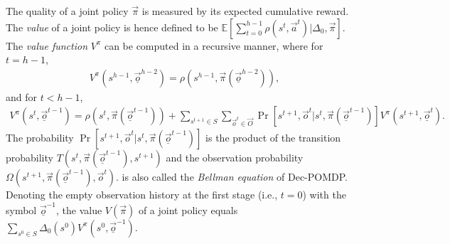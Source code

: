 The quality of a joint policy $\vec{\pi}$ is measured by its expected cumulative reward.
The \textit{value} of a joint policy is hence defined to be $\mathbb{E}[\sum_{t=0}^{h-1}\rho(s^t,\vec{a}^t)|\Delta_0,\vec{\pi}]$.
The \textit{value function} $V^\pi$ can be computed in a recursive manner, where for $t=h-1$,
\begin{align*}
    V^\pi(s^{h-1},\vec{\underline{o}}^{h-2})=\rho(s^{h-1},\vec{\pi}(\vec{\underline{o}}^{h-2})),
\end{align*}
and for $t<h-1$,
\begin{align}\label{eq:dssat-bellman}
    V^\pi(s^t,\vec{\underline{o}}^{t-1})=\rho(s^t,\vec{\pi}(\vec{\underline{o}}^{t-1}))+
    \sum_{s^{t+1}\in S}\sum_{\vec{o}^t\in\vec{O}}\Pr[s^{t+1},\vec{o}^t|s^t,\vec{\pi}(\vec{\underline{o}}^{t-1})]V^\pi(s^{t+1},\vec{\underline{o}}^{t}).
\end{align}
The probability $\Pr[s^{t+1},\vec{o}^{t}|s^t,\vec{\pi}(\vec{\underline{o}}^{t-1})]$ is the product of
the transition probability $T(s^t,\vec{\pi}(\vec{\underline{o}}^{t-1}),s^{t+1})$ and
the observation probability $\Omega(s^{t+1},\vec{\pi}(\vec{\underline{o}}^{t-1}),\vec{o}^{t})$.
 is also called the \textit{Bellman equation} of Dec-POMDP.
Denoting the empty observation history at the first stage (i.e., $t=0$) with the symbol $\vec{\underline{o}}^{-1}$, the value $V(\vec{\pi})$ of a joint policy equals $\sum_{s^0\in S}\Delta_0(s^0)V^\pi(s^0,\vec{\underline{o}}^{-1})$.